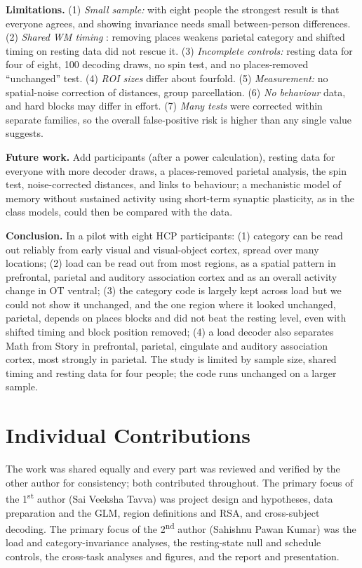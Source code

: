 \documentclass[conference]{IEEEtran}
\begin{document}
\textbf{Limitations.} (1) \emph{Small sample:} with eight people the strongest result is that everyone agrees, and showing invariance needs small between-person differences. (2) \emph{Shared WM timing} \cite{haynes2006}: removing places weakens parietal category and shifted timing on resting data did not rescue it. (3) \emph{Incomplete controls:} resting data for four of eight, 100 decoding draws, no spin test, and no places-removed ``unchanged'' test. (4) \emph{ROI sizes} differ about fourfold. (5) \emph{Measurement:} no spatial-noise correction of distances, group parcellation. (6) \emph{No behaviour} data, and hard blocks may differ in effort. (7) \emph{Many tests} were corrected within separate families, so the overall false-positive risk is higher than any single value suggests.

\textbf{Future work.} Add participants (after a power calculation), resting data for everyone with more decoder draws, a places-removed parietal analysis, the spin test, noise-corrected distances, and links to behaviour; a mechanistic model of memory without sustained activity using short-term synaptic plasticity, as in the class models, could then be compared with the data.

\textbf{Conclusion.} In a pilot with eight HCP participants: (1) category can be read out reliably from early visual and visual-object cortex, spread over many locations; (2) load can be read out from most regions, as a spatial pattern in prefrontal, parietal and auditory association cortex and as an overall activity change in OT ventral; (3) the category code is largely kept across load but we could not show it unchanged, and the one region where it looked unchanged, parietal, depends on places blocks and did not beat the resting level, even with shifted timing and block position removed; (4) a load decoder also separates Math from Story in prefrontal, parietal, cingulate and auditory association cortex, most strongly in parietal. The study is limited by sample size, shared timing and resting data for four people; the code runs unchanged on a larger sample.

\section*{Individual Contributions}
The work was shared equally and every part was reviewed and verified by the other author for consistency; both contributed throughout. The primary focus of the 1\textsuperscript{st} author (Sai Veeksha Tavva) was project design and hypotheses, data preparation and the GLM, region definitions and RSA, and cross-subject decoding. The primary focus of the 2\textsuperscript{nd} author (Sahishnu Pawan Kumar) was the load and category-invariance analyses, the resting-state null and schedule controls, the cross-task analyses and figures, and the report and presentation.
\end{document}
